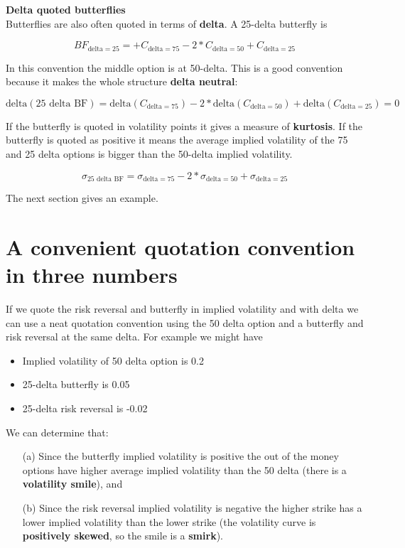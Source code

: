 \textbf{Delta quoted butterflies}\\
Butterflies are also often quoted in terms of \textbf{delta}. A 25-delta butterfly is 

\[BF_{\mbox{delta} = 25} = +C_{\mbox{delta}=75} -2*C_{\mbox{delta}=50} + C_{\mbox{delta}=25}\]

 In this convention the middle option is at 50-delta. This is a good convention because it makes the whole structure \textbf{delta neutral}:

\[\mbox{delta}(\mbox{25 delta BF})= \mbox{delta}(C_{\mbox{delta}=75}) -2*\mbox{delta}(C_{\mbox{delta}=50})+ \mbox{delta}(C_{\mbox{delta}=25}) = 0\]  


If the butterfly is quoted in volatility points it gives a measure of \textbf{kurtosis}. If the butterfly is quoted as positive it means the average implied volatility of the 75 and 25 delta options is bigger than the 50-delta implied volatility.

\[ \sigma_{\mbox{25 delta BF}}  = \sigma_{\mbox{delta} =75} - 2*\sigma_{\mbox{delta}=50} + \sigma_{\mbox{delta} = 25} \]

The next section gives an example.
 

\section{A convenient quotation convention in three numbers}

If we quote the risk reversal and butterfly in implied volatility and with delta we can use a neat quotation convention using the 50 delta option and a butterfly and risk reversal at the same delta. For example we might have

\begin{itemize}
\item Implied volatility of 50 delta option is 0.2
\item 25-delta butterfly is 0.05
\item 25-delta risk reversal is -0.02
\end{itemize}

We can determine that:

\begin{itemize}
\item[(a)] Since the butterfly implied volatility is positive the out of the money options have higher average implied volatility than the 50 delta (there is a \textbf{volatility smile}), and\\
\item[(b)] Since the risk reversal implied volatility is negative the higher strike has a lower implied volatility than the lower strike (the volatility curve is \textbf{positively skewed}, so the smile is a \textbf{smirk}).
\end{itemize}

